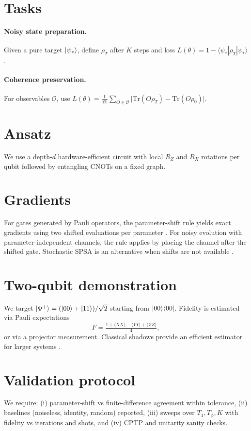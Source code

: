 \documentclass[11pt]{article}
\begin{document}
\section{Tasks}
\paragraph{Noisy state preparation.} Given a pure target \(\ket{\psi_*}\), define \(\rho_T\) after \(K\) steps and loss
\(L(\theta)=1-\langle\psi_*|\rho_T|\psi_*\rangle\).
\paragraph{Coherence preservation.} For observables \(\mathcal O\), use 
\(L(\theta)=\frac{1}{|\mathcal O|}\sum_{O\in\mathcal O}\big|\mathrm{Tr}(O\rho_T)-\mathrm{Tr}(O\rho_0)\big|\).

\section{Ansatz}
We use a depth-\(d\) hardware-efficient circuit with local \(R_Z\) and \(R_X\) rotations per qubit followed by entangling CNOTs on a fixed graph.

\section{Gradients}
For gates generated by Pauli operators, the parameter-shift rule yields exact gradients using two shifted evaluations per parameter \cite{MariPS,SchuldPS}. For noisy evolution with parameter-independent channels, the rule applies by placing the channel after the shifted gate. Stochastic SPSA is an alternative when shifts are not available \cite{SpallSPSA}.

\section{Two-qubit demonstration}
We target \(\ket{\Phi^+}=(\ket{00}+\ket{11})/\sqrt{2}\) starting from \(\ket{00}\!\bra{00}\). Fidelity is estimated via Pauli expectations
\begin{equation}
F=\tfrac{1+\langle XX\rangle-\langle YY\rangle+\langle ZZ\rangle}{4},
\end{equation}
or via a projector measurement. Classical shadows provide an efficient estimator for larger systems \cite{HuangShadows}.

\section{Validation protocol}
We require: (i) parameter-shift vs finite-difference agreement within tolerance, (ii) baselines (noiseless, identity, random) reported, (iii) sweeps over \(T_1,T_\phi,K\) with fidelity vs iterations and shots, and (iv) CPTP and unitarity sanity checks.
\end{document}
